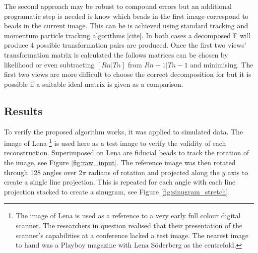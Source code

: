 The second approach may be robust to compound errors but an additional programatic step is needed is know which beads in the first image correspond to beads in the current image.
This can be is achieved using standard tracking and momentum particle tracking algorithms [cite].
In both cases a decomposed F will produce 4 possible transformation pairs %
are produced.
Once the first two views' transformation matrix is calculated the follows matrices can be chosen by likelihood or even subtracting \([Rn|Tn]\) from \(Rn-1|Tn-1\) and minimising.
The first two views are more difficult to choose the correct decomposition for but it is possible if a suitable ideal matrix is given as a comparison.

\subsection{Results}

To verify the proposed algorithm works, it was applied to simulated data.
The image of Lena
\footnote{The image of Lena is used as a reference to a very early full colour digital scanner.
The researchers in question realised that their presentation of the scanner's capabilities at a conference lacked a test image.
The nearest image to hand was a Playboy magazine with Lena Söderberg as the centrefold.}
is used here as a test image to verify the validity of each reconstruction.
Superimposed on Lena are fiducial beads to track the rotation of the image, see Figure \ref{fig:raw_input}.
The reference image was then rotated through 128 angles over $2\pi$ radians of rotation and projected along the $y$ axis to create a single line projection.
This is repeated for each angle with each line projection stacked to create a sinugram, see Figure \ref{fig:sinugram_stretch}.


